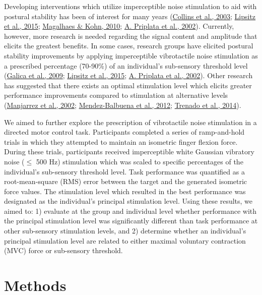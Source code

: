 \documentclass[]{cik}%
\begin{document}
Developing interventions which utilize imperceptible noise stimulation
to aid with postural stability has been of interest for many years
(\protect\hyperlink{ref-Collins2003}{Collins et al., 2003};
\protect\hyperlink{ref-Lipsitz2015}{Lipsitz et al., 2015};
\protect\hyperlink{ref-magalhuxe3es2011}{Magalhaes \& Kohn, 2010};
\protect\hyperlink{ref-Priplata2002}{A. Priplata et al., 2002}).
Currently, however, more research is needed regarding the signal content
and amplitude that elicits the greatest benefits. In some cases,
research groups have elicited postural stability improvements by
applying imperceptible vibrotactile noise stimulation as a prescribed
percentage (70-90\%) of an individual's sub-sensory threshold level
(\protect\hyperlink{ref-Galica2009}{Galica et al., 2009};
\protect\hyperlink{ref-Lipsitz2015}{Lipsitz et al., 2015};
\protect\hyperlink{ref-Priplata2002}{A. Priplata et al., 2002}). Other
research has suggested that there exists an optimal stimulation level
which elicits greater performance improvements compared to stimulation
at alternative levels (\protect\hyperlink{ref-Manjarrez2002}{Manjarrez
et al., 2002};
\protect\hyperlink{ref-Mendez-Balbuena2012}{Mendez-Balbuena et al.,
2012}; \protect\hyperlink{ref-Trenado2014}{Trenado et al., 2014}).

We aimed to further explore the prescription of vibrotactile noise
stimulation in a directed motor control task. Participants completed a
series of ramp-and-hold trials in which they attempted to maintain an
isometric finger flexion force. During these trials, participants
received imperceptible white Gaussian vibratory noise (\(\le\) 500 Hz)
stimulation which was scaled to specific percentages of the individual's
sub-sensory threshold level. Task performance was quantified as a
root-mean-square (RMS) error between the target and the generated
isometric force values. The stimulation level which resulted in the best
performance was designated as the individual's principal stimulation
level. Using these results, we aimed to: 1) evaluate at the group and
individual level whether performance with the principal stimulation
level was significantly different than task performance at other
sub-sensory stimulation levels, and 2) determine whether an individual's
principal stimulation level are related to either maximal voluntary
contraction (MVC) force or sub-sensory threshold.

\newpage

\hypertarget{methods}{%
\section{Methods}\label{methods}}
\end{document}
